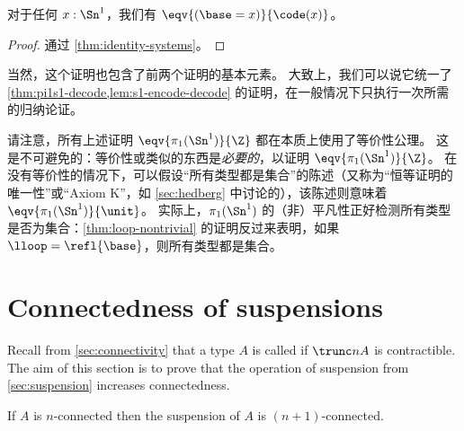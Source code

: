 \begin{cor}
  对于任何 $x:\Sn^1$，我们有 $\eqv{(\base=x)}{\code(x)}$。
\end{cor}
\begin{proof}
  通过 \cref{thm:identity-systems}。
\end{proof}

当然，这个证明也包含了前两个证明的基本元素。
大致上，我们可以说它统一了 \cref{thm:pi1s1-decode,lem:s1-encode-decode} 的证明，在一般情况下只执行一次所需的归纳论证。

\begin{rmk}
  请注意，所有上述证明 $\eqv{\pi_1(\Sn^1)}{\Z}$ 都在本质上使用了等价性公理。
  这是不可避免的：等价性或类似的东西是\emph{必要的}，以证明 $\eqv{\pi_1(\Sn^1)}{\Z}$。
  在没有等价性的情况下，可以假设“所有类型都是集合”的陈述（又称为“恒等证明的唯一性”或“Axiom K”，如 \cref{sec:hedberg} 中讨论的），该陈述则意味着 $\eqv{\pi_1(\Sn^1)}{\unit}$。
  实际上，$\pi_1(\Sn^1)$ 的（非）平凡性正好检测所有类型是否为集合：\cref{thm:loop-nontrivial} 的证明反过来表明，如果 $\lloop=\refl{\base}$，则所有类型都是集合。
\end{rmk}

\section{Connectedness of suspensions}
\label{sec:conn-susp}

Recall from \cref{sec:connectivity} that a type $A$ is called  if $\trunc nA$ is contractible.
The aim of this section is to prove that the operation of suspension from \cref{sec:suspension} increases connectedness.

\begin{thm} \label{thm:suspension-increases-connectedness}
  If $A$ is $n$-connected then the suspension of $A$ is $(n+1)$-connected.
\end{thm}

